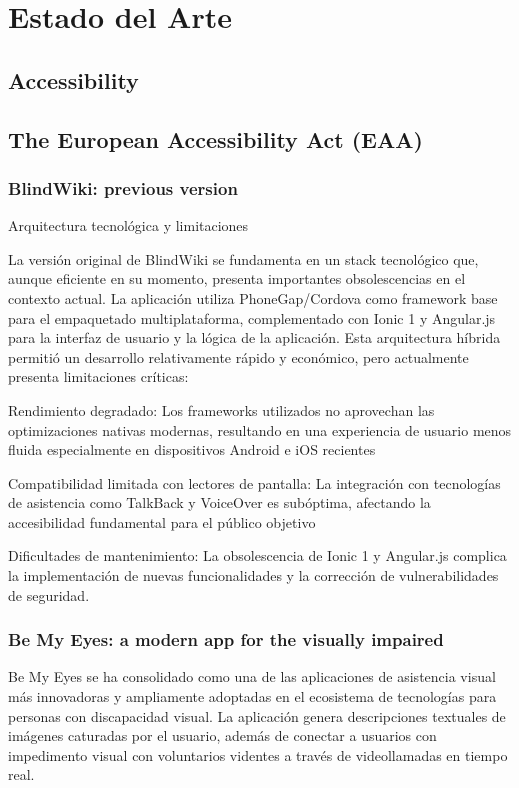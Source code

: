 \section{Estado del Arte}

\subsection{Accessibility}

\subsection{The European Accessibility Act (EAA)}

\subsubsection{BlindWiki: previous version}
Arquitectura tecnológica y limitaciones

La versión original de BlindWiki se fundamenta en un stack tecnológico que, aunque eficiente en su momento, presenta importantes obsolescencias en el contexto actual. La aplicación utiliza PhoneGap/Cordova como framework base para el empaquetado multiplataforma, complementado con Ionic 1 y Angular.js para la interfaz de usuario y la lógica de la aplicación. Esta arquitectura híbrida permitió un desarrollo relativamente rápido y económico, pero actualmente presenta limitaciones críticas:

Rendimiento degradado: Los frameworks utilizados no aprovechan las optimizaciones nativas modernas, resultando en una experiencia de usuario menos fluida especialmente en dispositivos Android e iOS recientes

Compatibilidad limitada con lectores de pantalla: La integración con tecnologías de asistencia como TalkBack y VoiceOver es subóptima, afectando la accesibilidad fundamental para el público objetivo

Dificultades de mantenimiento: La obsolescencia de Ionic 1 y Angular.js complica la implementación de nuevas funcionalidades y la corrección de vulnerabilidades de seguridad.

\subsubsection{Be My Eyes: a modern app for the visually impaired}
Be My Eyes se ha consolidado como una de las aplicaciones de asistencia visual más innovadoras y ampliamente adoptadas en el ecosistema de tecnologías para personas con discapacidad visual. La aplicación genera descripciones textuales de imágenes caturadas por el usuario, además de conectar a usuarios con impedimento visual con voluntarios videntes a través de videollamadas en tiempo real.






